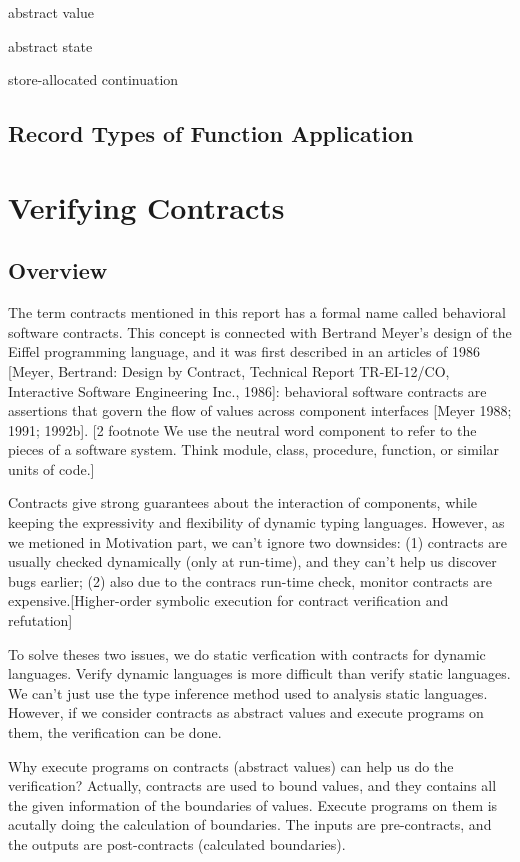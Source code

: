 \documentclass[paper=a4, fontsize=11pt]{scrartcl} %
\numberwithin{equation}{section} %
\numberwithin{figure}{section} %
\numberwithin{table}{section} %
\begin{document}
abstract value

abstract state

store-allocated continuation

\subsection{Record Types of Function Application}


\section{Verifying Contracts}

\subsection{Overview}
The term contracts mentioned in this report has a formal name called behavioral software contracts. This concept is connected with Bertrand Meyer's design of the Eiffel programming language, and it was first described in an articles of 1986 [Meyer, Bertrand: Design by Contract, Technical Report TR-EI-12/CO, Interactive Software Engineering Inc., 1986]: behavioral software contracts are assertions that govern the flow of values across component interfaces [Meyer 1988; 1991; 1992b].
[2 footnote We use the neutral word component to refer to the pieces of a software system. Think module, class, procedure, function, or similar units of code.]

Contracts give strong guarantees about the interaction of components, while keeping the expressivity and flexibility of dynamic typing languages. However, as we metioned in Motivation part, we can't ignore two downsides: (1) contracts are usually checked dynamically (only at run-time), and they can't help us discover bugs earlier; (2) also due to the contracs run-time check, monitor contracts are expensive.[Higher-order symbolic execution for contract verification and refutation]

To solve theses two issues, we do static verfication with contracts for dynamic languages. Verify dynamic languages is more difficult than verify static languages. We can't just use the type inference method used to analysis static languages. However, if we consider contracts as abstract values and execute programs on them, the verification can be done.

Why execute programs on contracts (abstract values) can help us do the verification? Actually, contracts are used to bound values, and they contains all the given information of the boundaries of values. Execute programs on them is acutally doing the calculation of boundaries. The inputs are pre-contracts, and the outputs are post-contracts (calculated boundaries).
\end{document}
